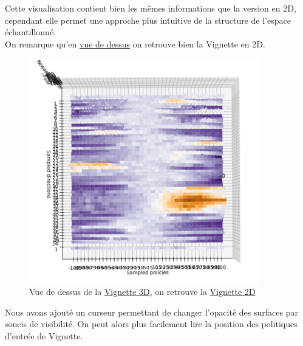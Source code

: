 \documentclass[12pt]{article}
\begin{document}
Cette visualisation contient bien les mêmes informations que la version en 2D, cependant elle permet une approche plus intuitive de la structure de l'espace échantillonné. \\

On remarque qu'en \hyperref[fig:vignetteDessus]{vue de dessus} on retrouve bien la Vignette en 2D. \\

\begin{figure}[htp]
    \centering
    \includegraphics[width=10cm]{Images/vignette_dessus}
    \caption{Vue de dessus de la \hyperref[fig:vignette3D]{Vignette 3D}, on retrouve la \hyperref[fig:vignettePendulum]{Vignette 2D}}
    \label{fig:vignetteDessus}
\end{figure}

\newpage
Nous avons ajouté un curseur permettant de changer l'opacité des surfaces par soucis de visibilité. On peut alors plus facilement lire la position des politiques d'entrée de Vignette. \\
\end{document}
